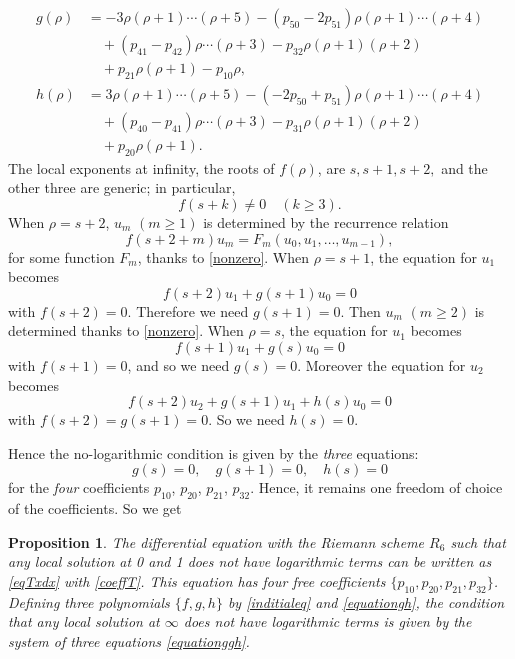 \documentclass[a4paper,12pt]{article}
\newtheorem{prp}[thm]{Proposition}
\theoremstyle{definition}
\theoremstyle{remark}
\numberwithin{equation}{section} %
\begin{document}
\begin{equation}\label{equationgh}  \begin{aligned}  g(\rho)
  &=
  -3\rho(\rho+1)\cdots(\rho+5)
  -(p_{50}-2p_{51})\rho(\rho+1)\cdots(\rho+4)\\
  &\quad
  +(p_{41}-p_{42})\rho\cdots(\rho+3)
  -p_{32}\rho(\rho+1)(\rho+2) \\
  &\quad +p_{21}\rho(\rho+1)
  -p_{10}\rho,\\
  h(\rho)
  &=
  3\rho(\rho+1)\cdots(\rho+5)
  -(-2p_{50}+p_{51})\rho(\rho+1)\cdots(\rho+4)\\
  &\quad
  +(p_{40}-p_{41})\rho\cdots(\rho+3)
  -p_{31}\rho(\rho+1)(\rho+2) \\
  &\quad +p_{20}\rho(\rho+1).
 \end{aligned} \end{equation}
The local exponents at infinity, the roots of $f(\rho)$,
are  $s,s+1,s+2,$ and the other three are generic; in particular,
\begin{equation} \label{nonzero} f(s+k)\neq0\quad(k\geq3).
\end{equation}
When $\rho=s+2$,
$u_m$ $(m\geq1)$ is determined by the recurrence relation
$$
 f(s+2+m)u_m=F_m(u_0,u_1,\dots,u_{m-1}),
$$
for some function $F_m$, thanks to \eqref{nonzero}.
When $\rho=s+1$, the equation for $u_1$ becomes
$$
 f(s+2)u_1+g(s+1)u_0=0
$$
with $f(s+2)=0$.
Therefore we need $g(s+1)=0$.
Then $u_m$ $(m\geq2)$ is determined thanks to \eqref{nonzero}.
When $\rho=s$,
the equation for $u_1$ becomes
$$
 f(s+1)u_1+g(s)u_0=0
$$
with $f(s+1)=0$, and so we need $g(s)=0$.
Moreover the equation for $u_2$ becomes
$$
 f(s+2)u_2+g(s+1)u_1+h(s)u_0=0
$$
with $f(s+2)=g(s+1)=0$. So we need $h(s)=0$.
\par
Hence  the no-logarithmic condition is given by the {\it three} equations:
\begin{equation}\label{equationggh}g(s)=0,\quad g(s+1)=0,\quad h(s)=0\end{equation}
  for the {\it four} coefficients $p_{10}$, $p_{20}$, $p_{21}$, $p_{32}$.
  Hence, it remains one freedom of choice of the coefficients. So we get

\begin{prp}\label{accpar1}
  The differential equation with the Riemann scheme $R_6$ such that any local solution at 0 and 1 does not have logarithmic terms can be written as \eqref{eqTxdx} with \eqref{coeffT}. This equation has four free coefficients $\{p_{10},p_{20},p_{21},p_{32}\}$. Defining three polynomials $\{f,g,h\}$ by \eqref{inditialeq} and \eqref{equationgh}, the condition that any local solution at $\infty$ does not have logarithmic terms is given by the system of three equations \eqref{equationggh}.
\end{prp}
\end{document}
